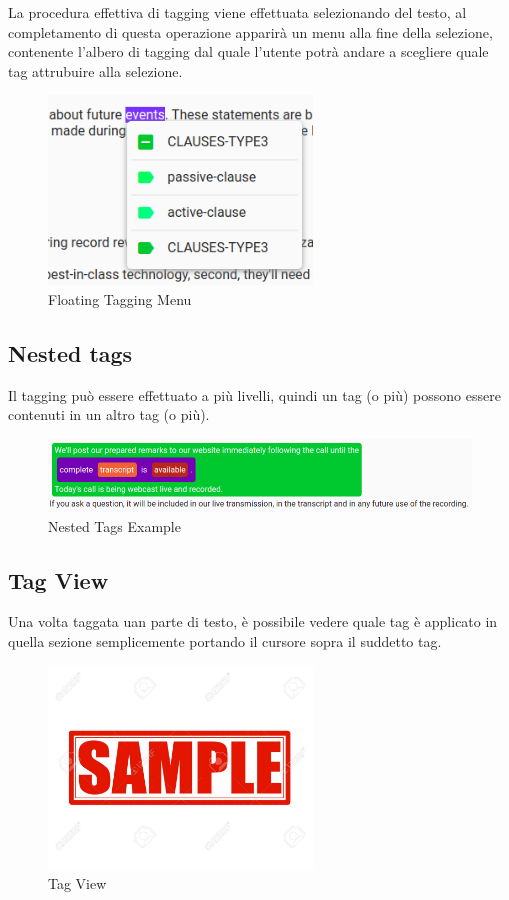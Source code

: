 \documentclass[twoside]{supsistudent}
\begin{document}
La procedura effettiva di tagging viene effettuata selezionando del testo, al
completamento di questa operazione apparirà un menu alla fine della selezione,
contenente l'albero di tagging dal quale l'utente potrà andare a scegliere
quale tag attrubuire alla selezione.

\begin{figure}[h!]
  \centering
  \includegraphics[width=7cm]{figures/floatingTag.png}
  \caption{Floating Tagging Menu}
  \label{fig:floatingTag}
\end{figure}

\pagebreak

\subsection{Nested tags}

Il tagging può essere effettuato a più livelli, quindi un tag (o più) possono
essere contenuti in un altro tag (o più).

\begin{figure}[h!]
  \includegraphics[width=\linewidth]{figures/nestedTags.png}
  \caption{Nested Tags Example}
  \label{fig:nestedTags}
\end{figure}

\subsection{Tag View}

Una volta taggata uan parte di testo, è possibile vedere quale tag è applicato
in quella sezione semplicemente portando il cursore sopra il suddetto tag.

\begin{figure}[h!]
  \centering
  \includegraphics[width=7cm]{figures/sample.jpg}
  \caption{Tag View}
  \label{fig:tagView}
\end{figure}
\end{document}
